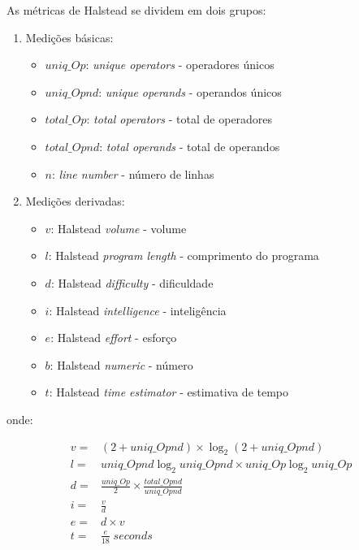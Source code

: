 \documentclass[10pt]{article}
\begin{document}
        As métricas de Halstead \cite{halstead1977elements} se dividem em dois grupos:

        \begin{enumerate}
            \item Medições básicas:
                \begin{itemize}
                    \item $uniq\_Op$: \textit{unique operators} - operadores únicos
                    \item $uniq\_Opnd$: \textit{unique operands} - operandos únicos
                    \item $total\_Op$: \textit{total operators} - total de operadores
                    \item $total\_Opnd$: \textit{total operands} - total de operandos
                    \item $n$: \textit{line number} - número de linhas
                \end{itemize}
            \item Medições derivadas:
                \begin{itemize}
                    \item $v$: Halstead \textit{volume} - volume
                    \item $l$: Halstead \textit{program length} - comprimento do programa
                    \item $d$: Halstead \textit{difficulty} - dificuldade
                    \item $i$: Halstead \textit{intelligence} - inteligência
                    \item $e$: Halstead \textit{effort} - esforço
                    \item $b$: Halstead \textit{numeric} - número
                    \item $t$: Halstead \textit{time estimator} - estimativa de tempo
                \end{itemize}
        \end{enumerate}

        \noindent onde:

        \begin{align*}
            v = & (2 + uniq\_Opnd) \times \log_2 (2 + uniq\_Opnd) \\
            l = & uniq\_Opnd \log_2 uniq\_Opnd \times uniq\_Op \log_2 uniq\_Op \\
            d = & \frac{uniq\_Op}{2} \times \frac{total\_Opnd}{uniq\_Opnd} \\
            i = & \frac{v}{d} \\
            e = & d \times v \\
            t = & \frac{e}{18} \; \textit{seconds}
        \end{align*}
\end{document}
